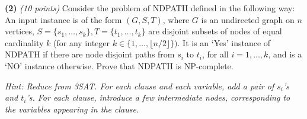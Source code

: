 \documentclass[12pt]{article}
\def\bigap{0.25in}
\begin{document}
\setlength{\parindent}{0in}
\addtolength{\parskip}{0.1cm}
\setlength{\fboxrule}{.5mm}\setlength{\fboxsep}{1.2mm}
\newlength{\boxlength}\setlength{\boxlength}{\textwidth}
\addtolength{\boxlength}{-4mm}
\begin{center}
\end{center}
\vspace{5mm}
\vskip \bigap
{\bf (2)} {\em (10 points)} Consider the problem of NDPATH defined in the following way: An input instance is of the form $(G,S,T)$, where $G$ is an undirected graph on $n$ vertices,  $S=\{s_1,\ldots,s_k \}, T=\{t_1,\ldots,t_k\}$ are disjoint subsets of nodes of equal cardinality $k$ (for any integer $k \in \{1,\ldots,\lfloor n/2 \rfloor \})$. It is an `Yes' instance of NDPATH if there are node disjoint paths from $s_i$ to $t_i$, for all $i=1,\ldots,k$, and is a `NO' instance otherwise. Prove that NDPATH is NP-complete.  

\emph{Hint: Reduce from 3SAT. For each clause and each variable, add a pair of $s_i$'s and $t_i$'s. For each clause, introduce a few intermediate nodes, corresponding to the variables appearing in the clause.}


\end{document}
